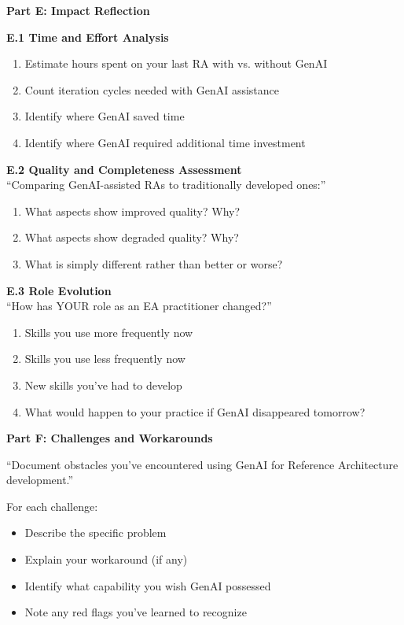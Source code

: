 \textbf{Part E: Impact Reflection}

\textbf{E.1 Time and Effort Analysis}
\begin{enumerate}[label=E.1.\arabic*]
    \item Estimate hours spent on your last RA with vs. without GenAI
    \item Count iteration cycles needed with GenAI assistance
    \item Identify where GenAI saved time
    \item Identify where GenAI required additional time investment
\end{enumerate}

\textbf{E.2 Quality and Completeness Assessment}\\
``Comparing GenAI-assisted RAs to traditionally developed ones:''
\begin{enumerate}[label=E.2.\arabic*]
    \item What aspects show improved quality? Why?
    \item What aspects show degraded quality? Why?
    \item What is simply different rather than better or worse?
\end{enumerate}

\textbf{E.3 Role Evolution}\\
``How has YOUR role as an EA practitioner changed?''
\begin{enumerate}[label=E.3.\arabic*]
    \item Skills you use more frequently now
    \item Skills you use less frequently now
    \item New skills you've had to develop
    \item What would happen to your practice if GenAI disappeared tomorrow?
\end{enumerate}

\textbf{Part F: Challenges and Workarounds}

``Document obstacles you've encountered using GenAI for Reference Architecture development.''

For each challenge:
\begin{itemize}
    \item Describe the specific problem
    \item Explain your workaround (if any)
    \item Identify what capability you wish GenAI possessed
    \item Note any red flags you've learned to recognize
\end{itemize}

